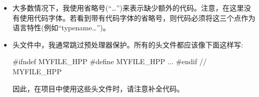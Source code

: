 \begin{itemize}
\item
大多数情况下，我使用省略号(“…”)来表示缺少额外的代码。注意，在这里没有使用代码字体。若看到带有代码字体的省略号，则代码必须将这三个点作为语言特性(例如“typename…”)。

\item
头文件中，我通常跳过预处理器保护。所有的头文件都应该像下面这样写:

\begin{cpp}
#ifndef MYFILE_HPP
#define MYFILE_HPP
...
#endif // MYFILE_HPP
\end{cpp}

因此，在项目中使用这些头文件时，请注意补全代码。
\end{itemize}














